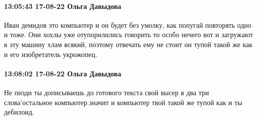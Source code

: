  
 
 
 
 

\paragraph{13:05:43 17-08-22 Ольга Давыдова}

Иван демидов это компьютер и он будет без умолку, как попугай повторять одно и
тоже. Они хохлы уже отупорилились говорить то особо нечего вот и загружают в
эту машину хлам всякий, поэтому отвечать ему не стоит он тупой такой же как и
его изобретатель укрожопец.

\paragraph{13:08:02 17-08-22 Ольга Давыдова}

Не пизди ты дописываешь до готового текста свой высер в два три слова'остальное
компьютер.значит и компьютер твой такой же тупой как и ты дебилоид.


